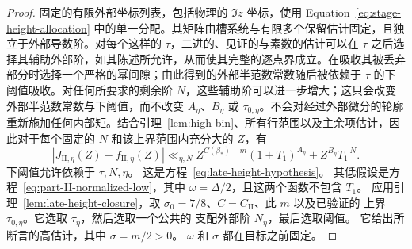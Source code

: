 \documentclass[11pt,a4paper]{article}
\numberwithin{equation}{section}
\numberwithin{figure}{section}
\theoremstyle{definition}
\theoremstyle{remark}
\begin{document}
\begin{proof}
固定的有限外部坐标列表，包括物理的 \(\Im z\) 坐标，使用
Equation~\eqref{eq:stage-height-allocation} 中的单一分配。其矩阵由槽系统与有限多个保留估计固定，且独立于外部导数阶。对每个这样的 \(\tau\)，二进的、见证的与素数的估计可以在 \(\tau\) 之后选择其辅助外部阶，如其陈述所允许，从而使其完整的逐点界成立。在吸收其被丢弃部分时选择一个严格的幂间隙；由此得到的外部半范数常数随后被依赖于 \(\tau\) 的下阈值吸收。对任何所要求的剩余阶 \(N\)，这些辅助阶可以进一步增大；这只会改变外部半范数常数与下阈值，而不改变 \(A_\eta\)、\(B_\eta\) 或 \(\tau_{0,\eta}\)。不会对经过外部微分的轮廓重新施加任何内部矩。结合引理~\ref{lem:high-bin}、所有行范围以及主余项估计，因此对于每个固定的 \(N\) 和该上界范围内充分大的 \(Z\)，有
\[
 |J_{\mathrm{II},\eta}(Z)-f_{\mathrm{II},\eta}(Z)|
 \ll_{\eta,N}
 Z^{C(\beta_*)-m}(1+T_1)^{A_\eta}
       +Z^{B_\eta}T_1^{-N}.
\]
下阈值允许依赖于 \(\tau,N,\eta\)。
这是方程~\eqref{eq:late-height-hypothesis}。
其低假设是方程~\eqref{eq:part-II-normalized-low}，其中 \(\omega=\Delta/2\)，且这两个函数不包含 \(T_1\)。
应用引理~\ref{lem:late-height-closure}，取
\(\sigma_0=7/8\)、\(C=C_{\mathrm{II}}\)、此 \(m\) 以及已验证的
上界 \(\tau_{0,\eta}\)。它选取 \(\tau_\eta\)，然后选取一个公共的
支配外部阶 \(N_\eta\)，最后选取阈值。
它给出所断言的高估计，其中 \(\sigma=m/2>0\)。
\(\omega\) 和 \(\sigma\) 都在目标之前固定。
\end{proof}
\end{document}
